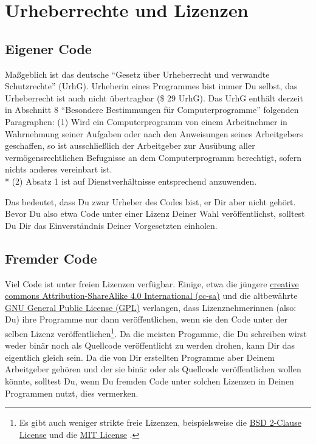 \documentclass[twoside]{scrreprt}
\begin{document}
\section{Urheberrechte und Lizenzen}
\subsection{Eigener Code}
Ma\ss{}geblich ist das deutsche "`Gesetz \"u{}ber Urheberrecht und verwandte
Schutzrechte"' (UrhG).
Urheberin eines Programmes bist immer Du selbst, das Urheberrecht ist auch nicht
\"u{}bertragbar (\$ 29 UrhG).
Das UrhG enth\"a{}lt derzeit in Abschnitt 8 "`Besondere Bestimmungen
f\"u{}r
Computerprogramme"' folgenden Paragraphen:
(1) Wird ein Computerprogramm von einem Arbeitnehmer in Wahrnehmung seiner
Aufgaben oder nach den Anweisungen seines Arbeitgebers geschaffen, so ist
ausschlie\ss{}lich der Arbeitgeber zur Aus\"u{}bung aller
verm\"o{}gensrechtlichen Befugnisse an dem Computerprogramm berechtigt, sofern
nichts anderes vereinbart ist.\\*
(2) Absatz 1 ist auf Dienstverh\"a{}ltnisse entsprechend anzuwenden.

Das bedeutet, dass Du zwar Urheber des Codes bist, er Dir aber nicht
geh\"o{}rt. Bevor Du also etwa Code unter einer Lizenz Deiner Wahl
ver\"o{}ffentlichst, solltest Du Dir das Einverst\"a{}ndnis Deiner Vorgesetzten
einholen.

\subsection{Fremder Code\label{sec:copy_foreign}}
Viel Code ist unter freien Lizenzen verf\"u{}gbar. Einige, etwa die
j\"u{}ngere \linebreak{}
\href{https://creativecommons.org/licenses/by-sa/4.0/legalcode}%
{creative commons Attribution-ShareAlike 4.0 International (cc-sa)}
und die altbew\"a{}hrte
\href{http://www.gnu.org/licenses/gpl-3.0.html}%
{GNU General Public License (GPL)}
verlangen, dass Lizenznehmerinnen (also: Du) ihre Programme nur dann
ver\"o{}ffentlichen, wenn sie den Code unter der selben Lizenz
ver\"o{}ffentlichen\footnote{Es gibt auch weniger strikte freie Lizenzen,
beispielsweise die
\href{http://opensource.org/licenses/BSD-2-Clause}{BSD 2-Clause License} und
die
\href{http://opensource.org/licenses/MIT}{MIT License}%
. }.
Da die meisten Progamme, die Du schreiben wirst weder bin\"a{}r noch als
Quellcode ver\"o{}ffentlicht zu werden drohen, kann Dir das eigentlich gleich
sein.
Da die von Dir erstellten Programme aber Deinem Arbeitgeber geh\"o{}ren und der
sie bin\"a{}r oder als Quellcode ver\"o{}ffentlichen wollen  k\"o{}nnte,
solltest Du, wenn Du fremden Code unter solchen Lizenzen in Deinen Programmen
nutzt, dies vermerken.
\end{document}

